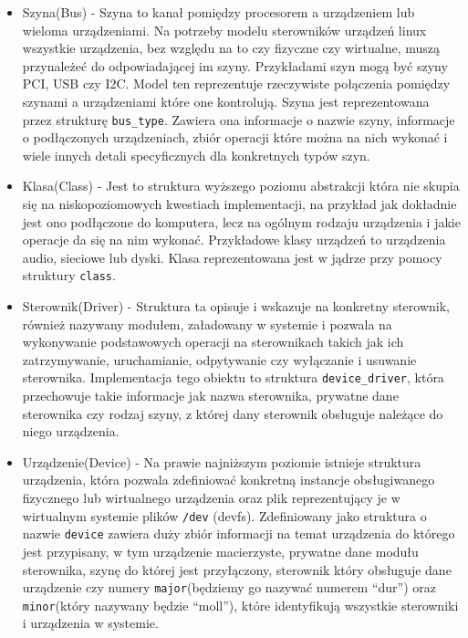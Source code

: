 \begin{itemize}
\item
  Szyna(Bus) - Szyna to kanał pomiędzy procesorem a urządzeniem lub
  wieloma urządzeniami. Na potrzeby modelu sterowników urządzeń linux
  wszystkie urządzenia, bez względu na to czy fizyczne czy wirtualne,
  muszą przynależeć do odpowiadającej im szyny. Przykładami szyn mogą
  być szyny PCI, USB czy I2C. Model ten reprezentuje rzeczywiste
  połączenia pomiędzy szynami a urządzeniami które one kontrolują. Szyna
  jest reprezentowana przez strukturę \texttt{bus\_type}. Zawiera ona
  informacje o nazwie szyny, informacje o podłączonych urządzeniach,
  zbiór operacji które można na nich wykonać i wiele innych detali
  specyficznych dla konkretnych typów szyn.
\item
  Klasa(Class) - Jest to struktura wyższego poziomu abstrakcji która nie
  skupia się na niskopoziomowych kwestiach implementacji, na przykład
  jak dokładnie jest ono podłączone do komputera, lecz na ogólnym
  rodzaju urządzenia i jakie operacje da się na nim wykonać. Przykładowe
  klasy urządzeń to urządzenia audio, sieciowe lub dyski. Klasa
  reprezentowana jest w jądrze przy pomocy struktury \texttt{class}.
\item
  Sterownik(Driver) - Struktura ta opisuje i wskazuje na konkretny
  sterownik, również nazywany modułem, załadowany w systemie i pozwala
  na wykonywanie podstawowych operacji na sterownikach takich jak ich
  zatrzymywanie, uruchamianie, odpytywanie czy wyłączanie i usuwanie
  sterownika. Implementacja tego obiektu to struktura
  \texttt{device\_driver}, która przechowuje takie informacje jak nazwa
  sterownika, prywatne dane sterownika czy rodzaj szyny, z której dany
  sterownik obsługuje należące do niego urządzenia.
\item
  Urządzenie(Device) - Na prawie najniższym poziomie istnieje struktura
  urządzenia, która pozwala zdefiniować konkretną instancje
  obsługiwanego fizycznego lub wirtualnego urządzenia oraz plik
  reprezentujący je w wirtualnym systemie plików \texttt{/dev} (devfs).
  Zdefiniowany jako struktura o nazwie \texttt{device} zawiera duży
  zbiór informacji na temat urządzenia do którego jest przypisany, w tym
  urządzenie macierzyste, prywatne dane modułu sterownika, szynę do
  której jest przyłączony, sterownik który obsługuje dane urządzenie czy
  numery \texttt{major}(będziemy go nazywać numerem ``dur'') oraz
  \texttt{minor}(który nazywany będzie ``moll''), które identyfikują
  wszystkie sterowniki i urządzenia w systemie.
\end{itemize}

